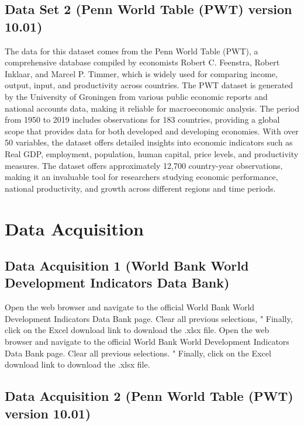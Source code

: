 \documentclass[12pt]{article}
\begin{document}
\subsection{Data Set 2 (Penn World Table (PWT) version 10.01)}

 The data for this dataset comes from the Penn World Table (PWT), a comprehensive database compiled by economists Robert C. Feenstra, Robert Inklaar, and Marcel P. Timmer, which is widely used for comparing income, output, input, and productivity across countries. The PWT dataset is generated by the University of Groningen from various public economic reports and national accounts data, making it reliable for macroeconomic analysis. The period from 1950 to 2019 includes observations for 183 countries, providing a global scope that provides data for both developed and developing economies. With over 50 variables, the dataset offers detailed insights into economic indicators such as Real GDP, employment, population, human capital, price levels, and productivity measures. The dataset offers approximately 12,700 country-year observations, making it an invaluable tool for researchers studying economic performance, national productivity, and growth across different regions and time periods.



\section{Data Acquisition}
\label{sec:theory}


    \subsection{Data Acquisition 1 (World Bank World Development Indicators Data Bank)}
    
Open the web browser and navigate to the official World Bank World Development Indicators Data Bank page. Clear all previous selections, " Finally, click on the Excel download link to download the .xlsx file.
Open the web browser and navigate to the official World Bank World Development Indicators Data Bank page. Clear all previous selections. " Finally, click on the Excel download link to download the .xlsx file.

    \subsection{Data Acquisition 2 (Penn World Table (PWT) version 10.01)}
    
\end{document}
